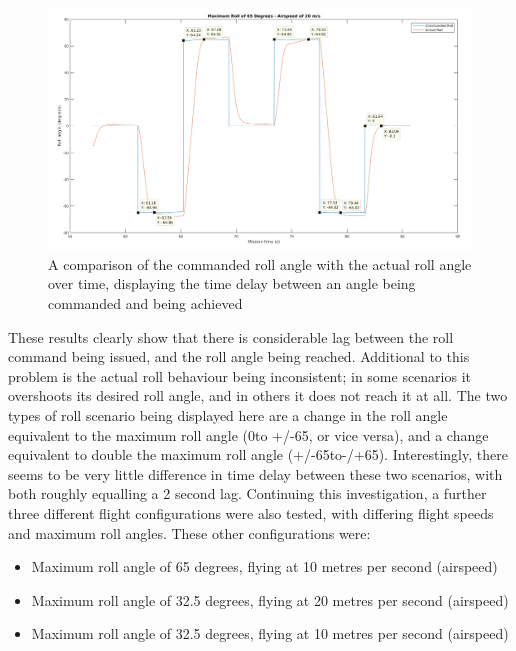 \begin{figure}[htbp!] 
\centering    
\includegraphics[angle=90,height=0.9\textheight]{65_20_cursors}
\caption[Comparing commanded roll angle with actual roll over time]{A comparison of the commanded roll angle with the actual roll angle over time, displaying the time delay between an angle being commanded and being achieved}
\label{fig:6520cursors}
\end{figure} 

These results clearly show that there is considerable lag between the roll command being issued, and the roll angle being reached. Additional to this problem is the actual roll behaviour being inconsistent; in some scenarios it overshoots its desired roll angle, and in others it does not reach it at all. The two types of roll scenario being displayed here are a change in the roll angle equivalent to the maximum roll angle (0\degree to +/-65\degree, or vice versa), and a change equivalent to double the maximum roll angle (+/-65\degree to-/+65\degree). Interestingly, there seems to be very little difference in time delay between these two scenarios, with both roughly equalling a 2 second lag. Continuing this investigation, a further three different flight configurations were also tested, with differing flight speeds and maximum roll angles. These other configurations were: 

\begin{itemize}
	\item Maximum roll angle of 65 degrees, flying at 10 metres per second (airspeed)
	\item Maximum roll angle of 32.5 degrees, flying at 20 metres per second (airspeed)
	\item Maximum roll angle of 32.5 degrees, flying at 10 metres per second (airspeed)
\end{itemize}

